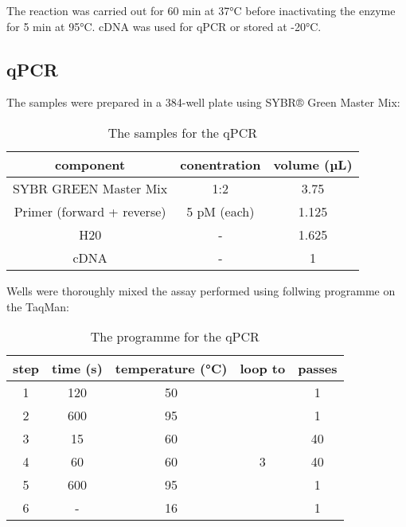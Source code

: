     \noindent The reaction was carried out for 60 min at 37°C before inactivating the enzyme for 5 min at 95°C. cDNA was used for qPCR or stored at -20°C.

    \subsection{qPCR}
    The samples were prepared in a 384-well plate using SYBR® Green Master Mix:

    \begin{table}[]
    \capstart
	\centering
	\begin{minipage}{\captionwidth}
	   	\caption[qPCR samples]{\newline The samples for the qPCR}
	   	\label{tab:qPCR_samples}
	\end{minipage}
    \begin{tabular}{|c|c|c|}
        \hline
        component                  & conentration & volume (µL) \\ \hline
        SYBR GREEN Master Mix      & 1:2          & 3.75        \\
        Primer (forward + reverse) & 5 pM (each)  & 1.125       \\
        H20                        & -            & 1.625       \\
        cDNA                       & -            & 1           \\ \hline
    \end{tabular}
    \end{table}

    \noindent Wells were thoroughly mixed the assay performed using follwing programme on the TaqMan:

    \begin{table}[]
    \capstart
    \centering
    \begin{minipage}{\captionwidth}
        \caption[qPCR programme]{\newline The programme for the qPCR}
        \label{tab:qPCR_programme}
    \end{minipage}
    \begin{tabular}{|c|c|c|c|c|}
    \hline
        step & time (s) & temperature (°C) & loop to & passes \\ \hline
        1    & 120      & 50               &         & 1      \\
        2    & 600      & 95               &         & 1      \\
        3    & 15       & 60               &         & 40     \\
        4    & 60       & 60               & 3       & 40     \\
        5    & 600      & 95               &         & 1      \\
        6    & -        & 16               &         & 1      \\ \hline
    \end{tabular}
    \end{table}

